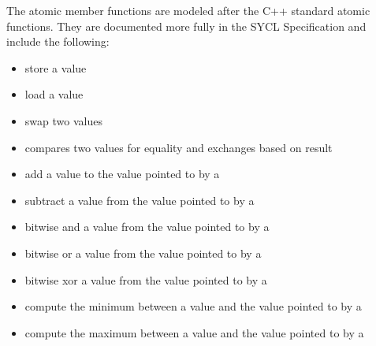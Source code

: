 \documentclass[letterpaper,10pt,english]{sphinxmanual}
\begin{document}
The atomic member functions are modeled after the C++ standard atomic
functions. They are documented more fully in the SYCL Specification and
include the following:
\begin{itemize}
\item {} 
 \textendash{} store a value

\item {} 
 \textendash{} load a value

\item {} 
 \textendash{} swap two values

\item {} 
 \sphinxhyphen{} compares two values for equality and
exchanges based on result

\item {} 
 \textendash{} add a value to the value pointed to by a

\item {} 
 \sphinxhyphen{} subtract a value from the value pointed to by a

\item {} 
 \textendash{} bitwise and a value from the value pointed to by a

\item {} 
 \sphinxhyphen{} bitwise or a value from the value pointed to by a

\item {} 
 \sphinxhyphen{} bitwise xor a value from the value pointed to by a

\item {} 
 \textendash{} compute the minimum between a value and the value
pointed to by a 

\item {} 
 \sphinxhyphen{} compute the maximum between a value and the value
pointed to by a 

\end{itemize}
\end{document}
